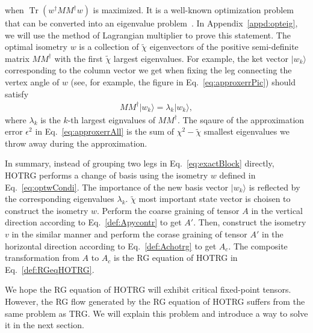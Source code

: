\documentclass[aps,prb,reprint,superscriptaddress]{revtex4-2}
\DeclareMathOperator{\Tr}{Tr}
\newcommand{\ket}[1]{|#1\rangle}
\begin{document}
when $\Tr\left(w^{\dagger}M M^{\dagger}w\right)$ is maximized. It is a
well-known optimization problem that can be converted into an eigenvalue
problem~\cite{ghojogh2019eigenvalue}. In Appendix~\ref{appd:opteig}, we
will use the method of Lagrangian multiplier to prove this statement.
The optimal isometry $w$ is a collection of $\tilde{\chi}$ eigenvectors
of the positive semi-definite matrix $M M^{\dagger}$ with the first
$\tilde{\chi}$ largest eigenvalues. For example, the ket vector
$\ket{w_k}$ corresponding to the column vector we get when fixing the
leg connecting the vertex angle of $w$ (see, for example, the figure in
Eq.~\eqref{eq:approxerrPic}) should satisfy 
%
\begin{align}\label{eq:optwCondi}
    M M^{\dagger}\ket{w_k} = \lambda_k \ket{w_k},     
\end{align}
%
where $\lambda_k$ is the $k$-th largest eignvalues of $M M^{\dagger}$.
The sqaure of the approximation error $\epsilon^2$ in
Eq.~\eqref{eq:approxerrAll} is the sum of $\chi^2 - \tilde{\chi}$
smallest eigenvalues we throw away during the approximation.
%

In summary, instead of grouping two legs in Eq.~\eqref{eq:exactBlock}
directly, HOTRG performs a change of basis using the isometry $w$
defined in Eq.~\eqref{eq:optwCondi}. The importance of the new basis
vector $\ket{w_k}$ is reflected by the corresponding eigenvalues
$\lambda_k$.  $\tilde{\chi}$ most important state vector is choisen to
construct the isometry $w$. Perform the coarse graining of tensor $A$ in
the vertical direction according to Eq.~\eqref{def:Apycontr} to get
$A'$. Then, construct the isometry $v$ in the similar manner and perform
the corase graining of tensor $A'$ in the horizontal direction according
to Eq.~\eqref{def:Achotrg} to get $A_c$. The composite transformation
from $A$ to $A_c$ is the RG equation of HOTRG in
Eq.~\eqref{def:RGeqHOTRG}.
%

We hope the RG equation of HOTRG will exhibit critical fixed-point
tensors. However, the RG flow generated by the RG equation of HOTRG
suffers from the same problem as TRG. We will explain this problem and
introduce a way to solve it in the next section.
\end{document}
